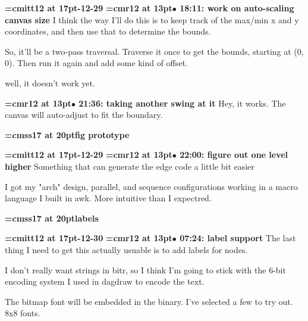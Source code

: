 {\medskip\noindent\bf\font\titlefont=cmitt12 at 17pt-12-29}\medskip
{\smallskip\noindent\bf\font\titlefont=cmr12 at 13pt\titlefont $\bullet$ 18:11: work on auto-scaling canvas size}\smallskip
I think the way I'll do this is to keep track of the max/min x and y coordinates, and then use that to determine the bounds.
\par

So, it'll be a two-pass traversal. Traverse it once to get the bounds, starting at (0, 0). Then run it again and add some kind of offset.
\par

well, it doesn't work yet.
\par

{\smallskip\noindent\bf\font\titlefont=cmr12 at 13pt\titlefont $\bullet$ 21:36: taking another swing at it}\smallskip
Hey, it works. The canvas will auto-adjust to fit the boundary.
\par

{\medskip\noindent\bf\font\titlefont=cmss17 at 20pt\titlefont fig prototype}\medskip

{\medskip\noindent\bf\font\titlefont=cmitt12 at 17pt-12-29}\medskip
{\smallskip\noindent\bf\font\titlefont=cmr12 at 13pt\titlefont $\bullet$ 22:00: figure out one level higher}\smallskip
Something that can generate the edge code a little bit easier
\par

I got my "arch" design, parallel, and sequence configurations working in a macro language I built in awk. More intuitive than I expectred.
\par

{\medskip\noindent\bf\font\titlefont=cmss17 at 20pt\titlefont labels}\medskip

{\medskip\noindent\bf\font\titlefont=cmitt12 at 17pt-12-30}\medskip
{\smallskip\noindent\bf\font\titlefont=cmr12 at 13pt\titlefont $\bullet$ 07:24: label support}\smallskip
The last thing I need to get this actually usuable is to add labels for nodes.
\par

I don't really want strings in bitr, so I think I'm going to stick with the 6-bit encoding system I used in dagdraw to encode the text.
\par

The bitmap font will be embedded in the binary. I've selected a few to try out. 8x8 fonts.
\par

